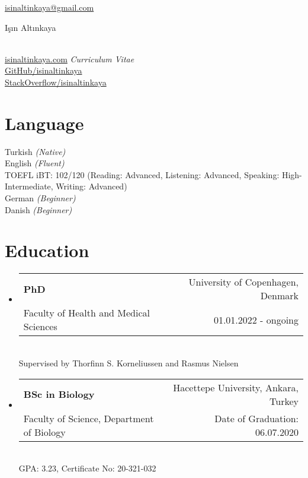 \documentclass[letterpaper,10.5pt]{article}
\makeatletter
\newcommand{\resumeSubheading}[5]{
  \vspace{-1pt}\item
    \begin{tabular*}{0.97\textwidth}{l@{\extracolsep{\fill}}r}
      \textbf{#1} & #2 \\
      {\small#3} & {\small #4} \\
    \end{tabular*}\vspace{3pt} \\
    #5
}
\newcommand{\resumeSubHeadingListStart}{\begin{itemize}[leftmargin=*]}
\newcommand{\resumeSubHeadingListEnd}{\end{itemize}}
\makeatother
\begin{document}

\href{mailto:isinaltinkaya@gmail.com}{isinaltinkaya@gmail.com}
\hfill \begin{Huge}I\c{s}{\i}n Alt{\i}nkaya \end{Huge} \\
\href{http://isinaltinkaya.com/}{isinaltinkaya.com}
\hfill \textit{Curriculum Vitae} \\
\href {https://github.com/isinaltinkaya}{GitHub/isinaltinkaya} \\
\href {https://stackoverflow.com/users/7870777/isin-altinkaya}{StackOverflow/isinaltinkaya} \\


 
 
\section{Language}
Turkish \textit{(Native)} \\
English \textit{(Fluent)} \\
\quad \small TOEFL iBT: 102/120 (Reading: Advanced, Listening: Advanced, Speaking: High-Intermediate, Writing: Advanced) \\
German \textit{(Beginner)} \\
Danish \textit{(Beginner)} 

\section{Education}
  \resumeSubHeadingListStart
    \resumeSubheading
      {PhD} {University of Copenhagen, Denmark}
      {Faculty of Health and Medical Sciences} {01.01.2022 - ongoing}
    \quad Supervised by Thorfinn S. Korneliussen and Rasmus Nielsen
    \resumeSubheading
      {BSc in Biology} {Hacettepe University, Ankara, Turkey}
      {Faculty of Science, Department of Biology} {Date of Graduation: 06.07.2020}
    \quad GPA: 3.23, \quad Certificate No: 20-321-032
  \resumeSubHeadingListEnd






\end{document}

